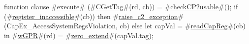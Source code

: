 function clause #\hyperref[zexecute]{execute}# (#\hyperref[zCGetTag]{CGetTag}#(rd, cb)) =
{
  #\hyperref[zcheckCPtwousable]{checkCP2usable}#();
  if (#\hyperref[zregisterzyinaccessible]{register\_inaccessible}#(cb)) then
    #\hyperref[zraisezyctwozyexception]{raise\_c2\_exception}#(CapEx_AccessSystemRegsViolation, cb)
  else
    let capVal = #\hyperref[zreadCapReg]{readCapReg}#(cb) in
    #\hyperref[zwGPR]{wGPR}#(rd) = #\hyperref[zzzerozyextend]{zero\_extend}#(capVal.tag);
}
